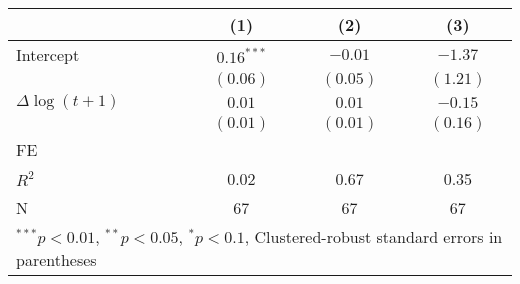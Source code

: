 
\begin{tabular}{l c c c }
\hline
 & (1) & (2) & (3) \\
\hline
Intercept & $0.16^{***}$ & $-0.01$  & $-1.37$  \\
            & $(0.06)$     & $(0.05)$ & $(1.21)$ \\
$\Delta \log(t+1)$     & $0.01$       & $0.01$   & $-0.15$  \\
            & $(0.01)$     & $(0.01)$ & $(0.16)$ \\
\hline
FE          &                &                &                \\ 
\hline
$R^2$       & 0.02         & 0.67     & 0.35     \\
N           & 67           & 67       & 67       \\
\hline
\multicolumn{4}{l}{\scriptsize{$^{***}p<0.01$, $^{**}p<0.05$, $^*p<0.1$, Clustered-robust standard errors in parentheses}}
\end{tabular}
